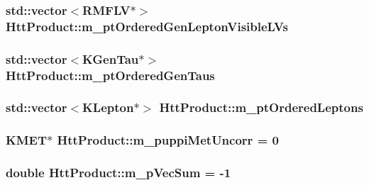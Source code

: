 \label{classHttProduct_aeed3fd71b9606c0d2a4d8da8500e510a}
\hypertarget{classHttProduct_aeea816c374d3c6bc8627b18a82830485}{
\subsubsection[{m\_\-ptOrderedGenLeptonVisibleLVs}]{\setlength{\rightskip}{0pt plus 5cm}std::vector$<$RMFLV$\ast$$>$ {\bf HttProduct::m\_\-ptOrderedGenLeptonVisibleLVs}}}
\label{classHttProduct_aeea816c374d3c6bc8627b18a82830485}
\hypertarget{classHttProduct_a4b39739074003e2a8c665d32005c4e2b}{
\subsubsection[{m\_\-ptOrderedGenTaus}]{\setlength{\rightskip}{0pt plus 5cm}std::vector$<$KGenTau$\ast$$>$ {\bf HttProduct::m\_\-ptOrderedGenTaus}}}
\label{classHttProduct_a4b39739074003e2a8c665d32005c4e2b}
\hypertarget{classHttProduct_accc7dc9b7ee8356d0163149738aa933b}{
\subsubsection[{m\_\-ptOrderedLeptons}]{\setlength{\rightskip}{0pt plus 5cm}std::vector$<$KLepton$\ast$$>$ {\bf HttProduct::m\_\-ptOrderedLeptons}}}
\label{classHttProduct_accc7dc9b7ee8356d0163149738aa933b}
\hypertarget{classHttProduct_aa787c5a62f9e8fcff5ba469b877864aa}{
\subsubsection[{m\_\-puppiMetUncorr}]{\setlength{\rightskip}{0pt plus 5cm}KMET$\ast$ {\bf HttProduct::m\_\-puppiMetUncorr} = 0}}
\label{classHttProduct_aa787c5a62f9e8fcff5ba469b877864aa}
\hypertarget{classHttProduct_aff3f5f7a0d777506d01369813d160925}{
\subsubsection[{m\_\-pVecSum}]{\setlength{\rightskip}{0pt plus 5cm}double {\bf HttProduct::m\_\-pVecSum} = -\/1}}
